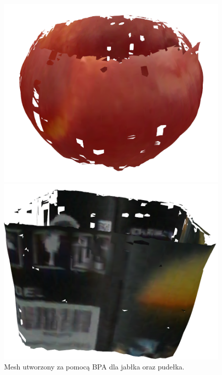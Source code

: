 \begin{figure}[H]
\centering
    \begin{minipage}[b]{0.45\linewidth}
        \includegraphics[scale=0.2]{bpaApple7x.PNG}
    \end{minipage}
\quad
    \begin{minipage}[b]{0.45\linewidth}
        \includegraphics[scale=0.2]{bpaBox7x.PNG}
    \end{minipage}
\caption{Mesh utworzony za pomocą BPA dla jabłka oraz pudełka.}
\label{fig:appleBoxBpa}
\end{figure}

